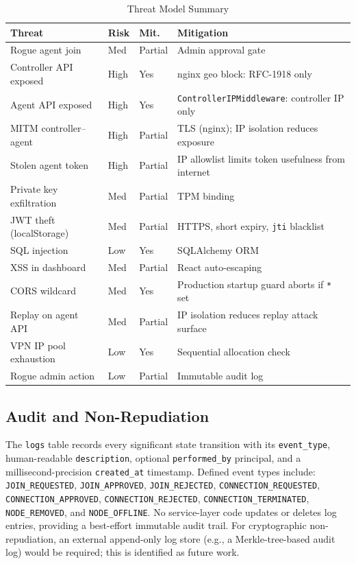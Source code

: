 \documentclass[conference]{IEEEtran}
\begin{document}
\begin{table}[!t]
\caption{Threat Model Summary}
\label{tab:threats}
\centering
\small
\begin{tabularx}{\columnwidth}{lllX}
\toprule
\textbf{Threat} & \textbf{Risk} & \textbf{Mit.} & \textbf{Mitigation} \\
\midrule
Rogue agent join            & Med  & Partial & Admin approval gate \\
Controller API exposed      & High & Yes     & nginx geo block: RFC-1918 only \\
Agent API exposed           & High & Yes     & \texttt{ControllerIPMiddleware}: controller IP only \\
MITM controller--agent      & High & Partial & TLS (nginx); IP isolation reduces exposure \\
Stolen agent token          & High & Partial & IP allowlist limits token usefulness from internet \\
Private key exfiltration    & Med  & Partial & TPM binding \\
JWT theft (localStorage)    & Med  & Partial & HTTPS, short expiry, \texttt{jti} blacklist \\
SQL injection               & Low  & Yes     & SQLAlchemy ORM \\
XSS in dashboard            & Med  & Partial & React auto-escaping \\
CORS wildcard               & Med  & Yes     & Production startup guard aborts if \texttt{*} set \\
Replay on agent API         & Med  & Partial & IP isolation reduces replay attack surface \\
VPN IP pool exhaustion      & Low  & Yes     & Sequential allocation check \\
Rogue admin action          & Low  & Partial & Immutable audit log \\
\bottomrule
\end{tabularx}
\end{table}

\subsection{Audit and Non-Repudiation}

The \texttt{logs} table records every significant state transition with its
\texttt{event\_type}, human-readable \texttt{description}, optional
\texttt{performed\_by} principal, and a millisecond-precision \texttt{created\_at}
timestamp. Defined event types include: \texttt{JOIN\_REQUESTED},
\texttt{JOIN\_APPROVED}, \texttt{JOIN\_REJECTED}, \texttt{CONNECTION\_REQUESTED},
\texttt{CONNECTION\_APPROVED}, \texttt{CONNECTION\_REJECTED},
\texttt{CONNECTION\_TERMINATED}, \texttt{NODE\_REMOVED}, and
\texttt{NODE\_OFFLINE}. No service-layer code updates or deletes log entries,
providing a best-effort immutable audit trail. For cryptographic non-repudiation,
an external append-only log store (e.g., a Merkle-tree-based audit log) would be
required; this is identified as future work.
\end{document}
